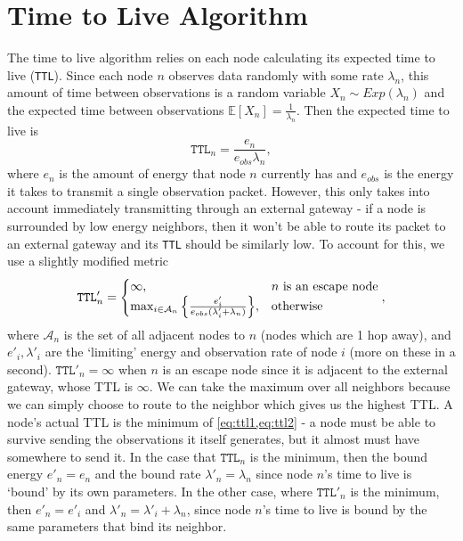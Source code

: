 \documentclass[headings=optiontoheadandtoc,listof=totoc,parskip=full]{scrartcl}
\def \expect {\mathbb{E}}
\begin{document}
\section{Time to Live Algorithm}
The time to live algorithm relies on each node calculating its expected time to live (\texttt{TTL}). Since each node $n$ observes data randomly with some rate $\lambda_n$, this amount of time between observations is a random variable $X_n \sim Exp(\lambda_n)$ and the expected time between observations $\expect[X_n] = \frac{1}{\lambda_n}$. Then the expected time to live is
\begin{equation} \label{eq:ttl1}
    \mathtt{TTL}_n = \frac{e_n}{e_{obs}\lambda_n},
\end{equation}
where $e_n$ is the amount of energy that node $n$ currently has and $e_{obs}$ is the energy it takes to transmit a single observation packet. However, this only takes into account immediately transmitting through an external gateway - if a node is surrounded by low energy neighbors, then it won't be able to route its packet to an external gateway and its \texttt{TTL} should be similarly low. To account for this, we use a slightly modified metric
\begin{equation} \label{eq:ttl2}
    \mathtt{TTL}'_n = \begin{cases}
        \infty, & n \text{ is an escape node}\\
        \max_{i \in \mathcal A_n} \qty{\frac{e'_i}{e_{obs}(\lambda'_i + \lambda_n)}}, & \text{otherwise}
    \end{cases},
\end{equation}
where $\mathcal A_n$ is the set of all adjacent nodes to $n$ (nodes which are 1 hop away), and $e'_i, \lambda'_i$ are the `limiting' energy and observation rate of node $i$ (more on these in a second). $\mathtt{TTL}'_n = \infty$ when $n$ is an escape node since it is adjacent to the external gateway, whose TTL is $\infty$. We can take the maximum over all neighbors because we can simply choose to route to the neighbor which gives us the highest TTL. A node's actual TTL is the minimum of \cref{eq:ttl1,eq:ttl2} - a node must be able to survive sending the observations it itself generates, but it almost must have somewhere to send it. In the case that $\mathtt{TTL}_n$ is the minimum, then the bound energy $e'_n = e_n$ and the bound rate $\lambda'_n = \lambda_n$ since node $n$'s time to live is `bound' by its own parameters. In the other case, where $\mathtt{TTL}'_n$ is the minimum, then $e'_n = e'_i$ and $\lambda'_n = \lambda'_i + \lambda_n$, since node $n$'s time to live is bound by the same parameters that bind its neighbor.
\end{document}

